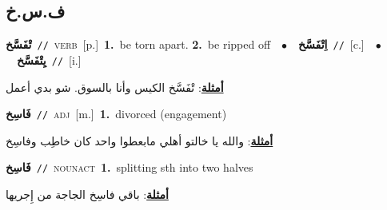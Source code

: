 \documentclass[10pt,a4paper,twoside]{article} %
\begin{document}
\begin{multicols}{2}
\vspace{-3mm}
\subsection*{\color{blue}\foreignlanguage{arabic}{ف.س.خ}\color{blue}{}} 

{\setlength\topsep{0pt}\textbf{\foreignlanguage{arabic}{تْفَسَّخ}}\ {\color{gray}\texttt{//}\color{black}}\ \textsc{verb}\ [p.]\ \textbf{1.}~be torn apart.  \textbf{2.}~be ripped off\ \ $\bullet$\ \ \setlength\topsep{0pt}\textbf{\foreignlanguage{arabic}{اِتْفَسَّخ}}\ {\color{gray}\texttt{//}\color{black}}\ [c.]\ \ $\bullet$\ \ \setlength\topsep{0pt}\textbf{\foreignlanguage{arabic}{يِتْفَسَّخ}}\ {\color{gray}\texttt{//}\color{black}}\ [i.]\  \begin{flushright}\color{gray}\foreignlanguage{arabic}{\textbf{\underline{\foreignlanguage{arabic}{أمثلة}}}: تْفَسَّخ الكيس وأنا بالسوق. شو بدي أعمل}\end{flushright}\color{black}} \vspace{2mm}

{\setlength\topsep{0pt}\textbf{\foreignlanguage{arabic}{فَاسِخ}}\ {\color{gray}\texttt{//}\color{black}}\ \textsc{adj}\ [m.]\ \textbf{1.}~divorced (engagement)\  \begin{flushright}\color{gray}\foreignlanguage{arabic}{\textbf{\underline{\foreignlanguage{arabic}{أمثلة}}}: والله يا خالتو أهلي مابعطوا واحد كان خاطِب وفاسِخ}\end{flushright}\color{black}} \vspace{2mm}

{\setlength\topsep{0pt}\textbf{\foreignlanguage{arabic}{فَاسِخ}}\ {\color{gray}\texttt{//}\color{black}}\ \textsc{noun\textunderscore act}\ \textbf{1.}~splitting sth into two halves\  \begin{flushright}\color{gray}\foreignlanguage{arabic}{\textbf{\underline{\foreignlanguage{arabic}{أمثلة}}}: باقي فاسِخ الجاجة من إِجريها}\end{flushright}\color{black}} \vspace{2mm}


\end{multicols}
\end{document}
